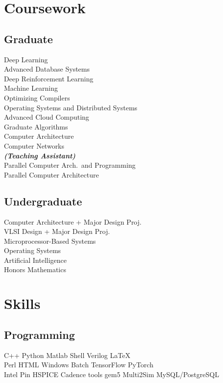 \documentclass[]{resume}
\begin{document}
\begin{minipage}[t]{0.377\textwidth}

\section{Coursework}
\subsection{Graduate}
Deep Learning \\
Advanced Database Systems \\
Deep Reinforcement Learning \\
Machine Learning \\
Optimizing Compilers \\
Operating Systems and Distributed Systems \\
Advanced Cloud Computing \\
Graduate Algorithms \\
Computer Architecture \\
Computer Networks \\
{\footnotesize \textit{\textbf{(Teaching Assistant)}}} \\
Parallel Computer Arch.\ and Programming \\
Parallel Computer Architecture
\sectionsep%

\subsection{Undergraduate}
Computer Architecture + Major Design Proj. \\
VLSI Design + Major Design Proj. \\
Microprocessor-Based Systems \\
Operating Systems \\
Artificial Intelligence \\
Honors Mathematics


\section{Skills}
\subsection{Programming}
C++ \textbullet{} Python \textbullet{} Matlab \textbullet{} Shell \textbullet{}
Verilog \textbullet{} \LaTeX%
\\
Perl \textbullet{} HTML \textbullet{} Windows Batch
\textbullet{} TensorFlow \textbullet{} PyTorch \\
Intel Pin \textbullet{} HSPICE \textbullet{} Cadence tools \textbullet{}
gem5 \textbullet{} Multi2Sim \textbullet{} MySQL/PostgreSQL
\sectionsep%

%
%

\end{minipage}
\end{document}
